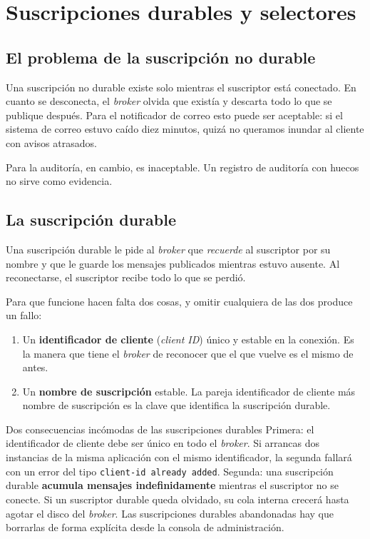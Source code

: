 \documentclass[11pt,a4paper]{book}
\begin{document}
\chapter{Suscripciones durables y selectores}
\label{cap:durables}

\section{El problema de la suscripción no durable}

Una suscripción no durable existe solo mientras el suscriptor está conectado.
En cuanto se desconecta, el \emph{broker} olvida que existía y descarta todo lo que se publique después.
Para el notificador de correo esto puede ser aceptable: si el sistema de correo estuvo caído diez minutos, quizá no queramos inundar al cliente con avisos atrasados.

Para la auditoría, en cambio, es inaceptable.
Un registro de auditoría con huecos no sirve como evidencia.

\section{La suscripción durable}

Una suscripción durable le pide al \emph{broker} que \emph{recuerde} al suscriptor por su nombre y que le guarde los mensajes publicados mientras estuvo ausente.
Al reconectarse, el suscriptor recibe todo lo que se perdió.

Para que funcione hacen falta dos cosas, y omitir cualquiera de las dos produce un fallo:

\begin{enumerate}[leftmargin=1.8em,itemsep=3pt,topsep=3pt]
	\item Un \textbf{identificador de cliente} (\emph{client ID}) único y estable en la conexión. Es la manera que tiene el \emph{broker} de reconocer que el que vuelve es el mismo de antes.
	\item Un \textbf{nombre de suscripción} estable. La pareja identificador de cliente más nombre de suscripción es la clave que identifica la suscripción durable.
\end{enumerate}

\begin{cajaAviso}{Dos consecuencias incómodas de las suscripciones durables}
	Primera: el identificador de cliente debe ser único en todo el \emph{broker}. Si arrancas dos instancias de la misma aplicación con el mismo identificador, la segunda fallará con un error del tipo \texttt{client-id already added}.
	Segunda: una suscripción durable \textbf{acumula mensajes indefinidamente} mientras el suscriptor no se conecte. Si un suscriptor durable queda olvidado, su cola interna crecerá hasta agotar el disco del \emph{broker}. Las suscripciones durables abandonadas hay que borrarlas de forma explícita desde la consola de administración.
\end{cajaAviso}
\end{document}
